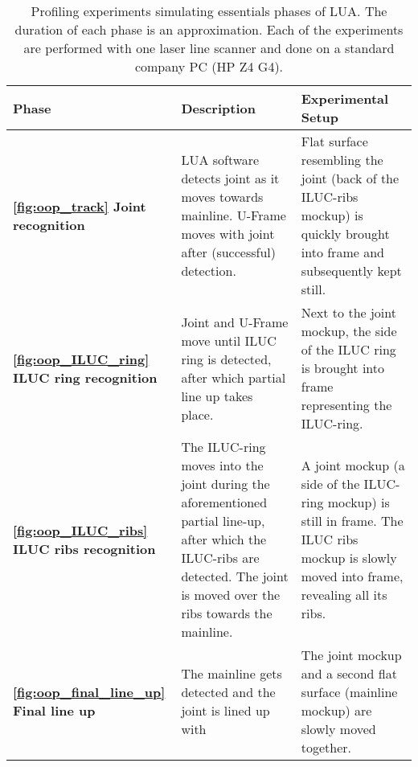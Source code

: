 \begin{table}[H]
    \centering
    \begin{tabular}{|p{4cm}|p{5.5cm}|p{5cm}|}
        \hline
        \textbf{Phase}& \textbf{Description} & \textbf{Experimental Setup} \\ \hline

        \textbf{\ref{fig:oop_track} Joint recognition} & LUA software detects joint as it moves towards mainline. U-Frame moves with joint after (successful) detection. & Flat surface resembling the joint (back of the ILUC-ribs mockup) is quickly brought into frame and subsequently kept still.\\ \hline

        \textbf{\ref{fig:oop_ILUC_ring} ILUC ring recognition} & Joint and U-Frame move until ILUC ring is detected, after which partial line up takes place. & Next to the joint mockup, the side of the ILUC ring is brought into frame representing the ILUC-ring.\\ \hline

        \textbf{\ref{fig:oop_ILUC_ribs} ILUC ribs recognition} & The ILUC-ring moves into the joint during the aforementioned partial line-up, after which the ILUC-ribs are detected. The joint is moved over the ribs towards the mainline. & A joint mockup (a side of the ILUC-ring mockup) is still in frame. The ILUC ribs mockup is slowly moved into frame, revealing all its ribs. \\ \hline

        \textbf{\ref{fig:oop_final_line_up} Final line up}  & The mainline gets detected and the joint is lined up with & The joint mockup and a second flat surface (mainline mockup) are slowly moved together. \\ \hline
    \end{tabular}
    \caption{Profiling experiments simulating essentials phases of LUA. The duration of each phase is an approximation. Each of the experiments are performed with one laser line scanner and done on a standard company PC (HP Z4 G4).}
    \label{tab:experimental_phases}
\end{table}